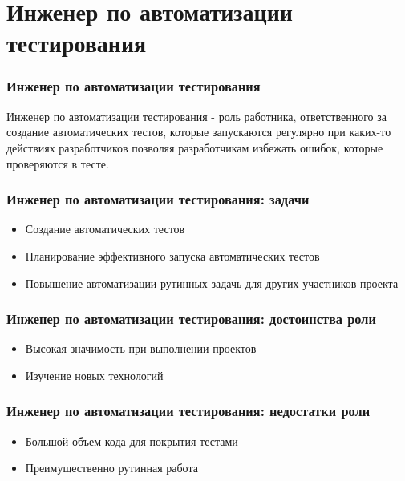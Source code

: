 \documentclass{../industrial-development}
\begin{document}
	
	
	\section{Инженер по автоматизации тестирования}
	
	\begin{frame} \frametitle{Инженер по автоматизации тестирования}
		\begin{block}{}
			\alert {Инженер по автоматизации тестирования} - роль работника, ответственного за создание автоматических тестов, которые запускаются регулярно при каких-то действиях разработчиков позволяя разработчикам избежать ошибок, которые проверяются в тесте.
		\end{block}
		
	\end{frame}
	
	\begin{frame} \frametitle{Инженер по автоматизации тестирования: задачи}
		\begin{block}{}
			\begin{itemize}
				\item Создание автоматических тестов
				\item Планирование эффективного запуска автоматических тестов
				\item Повышение автоматизации рутинных задачь для других участников проекта		
			\end{itemize}
		\end{block}
		
	\end{frame}
	
	\begin{frame} \frametitle{Инженер по автоматизации тестирования: достоинства роли}
		\begin{block}{}
			\begin{itemize}
				\item Высокая значимость при выполнении проектов
				\item Изучение новых технологий
			\end{itemize}
		\end{block}
		
	\end{frame}
	
	\begin{frame} \frametitle{Инженер по автоматизации тестирования: недостатки роли}
		\begin{block}{}
			\begin{itemize}
				\item Большой объем кода для покрытия тестами
				\item Преимущественно рутинная работа
			\end{itemize}
		\end{block}
		
	\end{frame}
	
\end{document}
